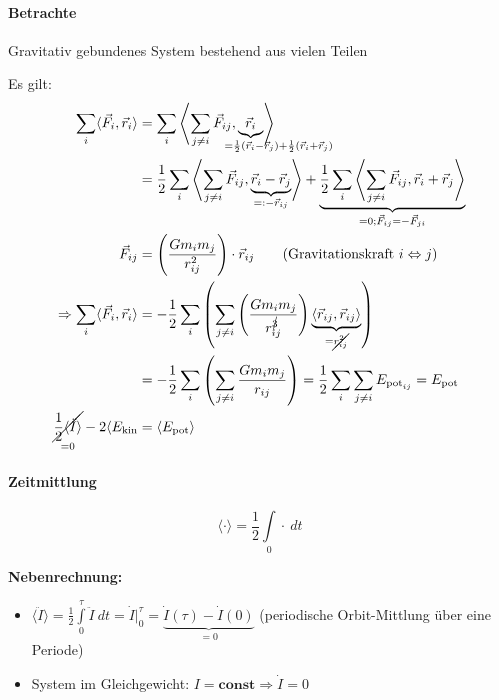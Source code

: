 \paragraph{Betrachte} Gravitativ gebundenes System bestehend aus vielen Teilen

Es gilt:
\begin{align*}
    \sum\limits_i \langle\vec F_i, \vec r_i\rangle &= \sum\limits_i \left\langle\sum\limits_{j \neq i} \vec F_{ij}, \underbrace{\vec r_i}_{\mathclap{\qquad\qquad= \frac{1}{2} (\vec r_i - \vec r_j) + \frac{1}{2} (\vec r_i + \vec r_j)}}\right\rangle\\
                &= \frac{1}{2} \sum\limits_i \left\langle\sum\limits_{j \neq i} \vec F_{ij}, \underbrace{\vec r_i - \vec r_j}_{=: - \vec r_{ij}}\right\rangle + \underbrace{\frac{1}{2} \sum\limits_i \left\langle\sum\limits_{j \neq i} \vec F_{ij}, \vec r_i + \vec r_j\right\rangle}_{= 0; \vec F_{ij} = -\vec F_{ji}} \\
    \vec F_{ij} &= \left(\frac{Gm_im_j}{r_{ij}^2}\right) \cdot \vec r_{ij} \tag{Gravitationskraft $i \Leftrightarrow j$}\\
    \Rightarrow \sum\limits_i \langle\vec F_i, \vec r_i\rangle &= -\frac{1}{2} \sum\limits_i\left(\sum\limits_{j \neq i} \left(\frac{Gm_im_j}{r_{ij}^{\cancel{3}}}\right) \underbrace{\langle\vec r_{ij}, \vec r_{ij}\rangle}_{= \cancel{r_{ij}^2}}\right)\\
        &= -\frac{1}{2} \sum\limits_i \left(\sum\limits_{j \neq i} \frac{G m_i m_j}{r_{ij}}\right) = \frac{1}{2} \sum\limits_i \sum\limits_{j \neq i} E_{\mathrm{pot}_{ij}} = E_{\mathrm{pot}}\\
    \underset{=0}{\cancel{\frac{1}{2} \langle\ddot I\rangle}} - 2 \langle E_{\mathrm{kin}} &= \langle E_{\mathrm{pot}}\rangle
\end{align*}

\paragraph{Zeitmittlung} \[\langle \cdot \rangle = \frac{1}{2} \int\limits_0 \cdot\ dt\]

\color{OliveGreen}
\textbf{Nebenrechnung:}
\begin{itemize}
    \item $\langle \ddot I \rangle = \frac{1}{2} \int\limits_0^{\tau} \ddot I\ dt = \dot I |_0^{\tau} = \underbrace{\dot I(\tau) - \dot I(0)}_{=0}$ (periodische Orbit-Mittlung über eine Periode)
    \item System im Gleichgewicht: $I = \mathbf{const} \Rightarrow \dot I = 0$
\end{itemize}
\color{black}


